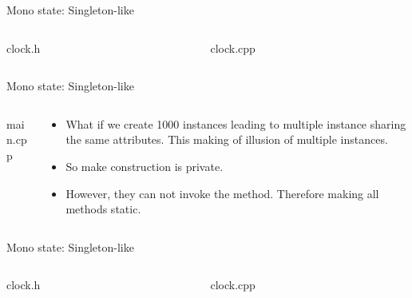 \documentclass[13pt]{beamer}
\begin{document}
\begin{frame}{Mono state: Singleton-like}
\begin{columns}[T]
	\begin{column}{.45\textwidth}
		clock.h
		\lstset{basicstyle=\tiny,style=myCustomCppStyle}
		
	\end{column}
	
	\begin{column}{.45\textwidth}
		clock.cpp
		\lstset{basicstyle=\tiny,style=myCustomCppStyle}
		
	\end{column}
\end{columns}
\end{frame}

\begin{frame}{Mono state: Singleton-like}
\begin{columns}[T]
	\begin{column}{.45\textwidth}
		main.cpp
		\lstset{basicstyle=\tiny,style=myCustomCppStyle}
		
	\end{column}
	
	\begin{column}{.45\textwidth}
		\begin{itemize}
			\setlength\itemsep{1em}
			\item What if we create 1000 instances leading to multiple instance sharing the same attributes. This making of illusion of multiple instances.
			\item So make construction is private.
			\item However, they can not invoke the method. Therefore making all methods static.
		\end{itemize}
	\end{column}
\end{columns}
\end{frame}

\begin{frame}{Mono state: Singleton-like}
\begin{columns}[T]
	\begin{column}{.45\textwidth}
		clock.h
		\lstset{basicstyle=\tiny,style=myCustomCppStyle}
		
	\end{column}
	
	\begin{column}{.45\textwidth}
		clock.cpp
		\lstset{basicstyle=\tiny,style=myCustomCppStyle}
		
	\end{column}
\end{columns}
\end{frame}
\end{document}
